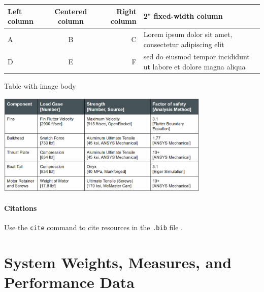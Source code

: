 \documentclass[report]{sac}
\newif\ifwip
\renewenvironment{table}{\comment}{\endcomment}
\newcommand\putdescription[1]
{
	\ifwip
		\begingroup
		\small\em
		#1
		\endgroup
	\fi
}
\begin{document}
		\begin{table}[H]
			\centering
			\caption{Informative table caption}

			\begin{tabular}{|l|cr|p{2in}|} 

				\hline Left column & Centered column & Right column & 2" fixed-width
				column \\
				\hline A & B & C & Lorem ipsum dolor sit amet, consectetur adipiscing elit \\
				\hline D & E & F & sed do eiusmod tempor incididunt ut labore et
				dolore magna aliqua \\
				\hline %
			\end{tabular}	
			\label{tbl:example-table}
		\end{table}	

		\begin{table}[H]
			\centering
			\caption{Table with image body}
			\includegraphics[width=4in]{fig/table.png}
			\label{tbl:fos-summary-example}
		\end{table}

		\paragraph{Citations} Use the \verb|cite| command to cite resources in the
		\verb|.bib| file \cite{peyret2012computational, oates1997aerothermodynamics}.
	\fi

	\section{System Weights, Measures, and Performance Data}\label{measures}
	\putdescription{\SystemMeasuresDescription}
\end{document}
